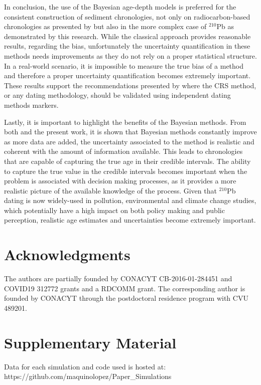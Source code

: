 \documentclass [10pt] {article}
\begin{document}
In conclusion, the use of the Bayesian age-depth models is preferred for the consistent construction of sediment chronologies, not only on radiocarbon-based chronologies as presented by \citet{Blaauw2018} but also in the more complex case of $^{210}$Pb as demonstrated by this research.
While the classical approach provides reasonable results, regarding the bias, unfortunately the uncertainty quantification in these methods needs improvements as they do not rely on a proper statistical structure. 
In a real-world scenario, it is impossible to measure the true bias of a method and therefore a proper uncertainty quantification becomes extremely important.
These results support the recommendations presented by \citet{Smith2001,Barsanti2020} where the CRS method, or any dating methodology, should be validated using independent dating methods markers. 

Lastly, it is important to highlight the benefits of the Bayesian methods.
From both \citet{Blaauw2018} and the present work, it is shown that Bayesian methods constantly improve as more data are added, the uncertainty associated to the method is realistic and coherent with the amount of information available. This leads to chronologies that are capable of capturing the true age in their credible intervals. 
The ability to capture the true value in the credible intervals becomes important when the problem is associated with decision making processes, as it provides a more realistic picture of the available knowledge of the process. 
Given that $^{210}$Pb dating is now widely-used in pollution, environmental and climate change studies, which potentially have a high impact on both policy making and public perception, realistic age estimates and uncertainties become extremely important. 



\section{Acknowledgments}

The authors are partially founded by CONACYT CB-2016-01-284451 and COVID19 312772 grants and a RDCOMM grant.
The corresponding author is founded by CONACYT through the postdoctoral residence program with CVU  489201.




\newpage




\section{Supplementary Material}
\label{sec:supp_mat}
Data for each simulation and code used is hosted at: https://github.com/maquinolopez/Paper\_Simulations
\end{document}
